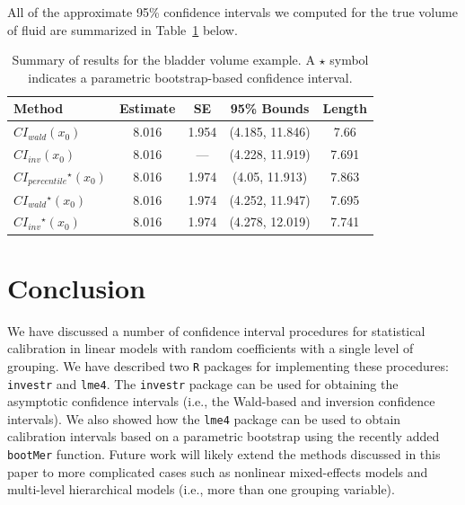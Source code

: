 \documentclass{article}\usepackage[]{graphicx}\usepackage[]{color}
\newcommand{\boot}{\ensuremath{^\star}}
\begin{document}
All of the approximate 95\% confidence intervals we computed for the true volume of fluid are summarized in Table~\ref{tab:summary} below.



\begin{table}[!htb]
\centering
\begin{tabular}{lcccc}
  \toprule
  Method                      &  Estimate & SE & 95\% Bounds & Length \\
  \midrule
  $CI_{wald}\left(x_0\right)$                 & 8.016 & 1.954 & (4.185, 11.846) & 7.66 \\
  $CI_{inv}\left(x_0\right)$            & 8.016 &  ---            & (4.228, 11.919) & 7.691 \\
  $CI_{percentile}\boot\left(x_0\right)$     & 8.016 & 1.974 & (4.05, 11.913) & 7.863 \\
  $CI_{wald}\boot\left(x_0\right)$           & 8.016 & 1.974 & (4.252, 11.947) & 7.695 \\
  $CI_{inv}\boot\left(x_0\right)$      & 8.016 & 1.974 & (4.278, 12.019) & 7.741 \\
  \bottomrule
\end{tabular}
\caption{Summary of results for the bladder volume example.  A $\star$ symbol indicates a parametric bootstrap-based confidence interval. \label{tab:summary}}
\end{table}


\section{Conclusion}

We have discussed a number of confidence interval procedures for statistical calibration in linear models with random coefficients with a single level of grouping.  We have described two \texttt{R} packages for implementing these procedures: \texttt{investr} and \texttt{lme4}.  The \texttt{investr} package can be used for obtaining the asymptotic confidence intervals (i.e., the Wald-based and inversion confidence intervals).  We also showed how the \texttt{lme4} package can be used to obtain calibration intervals based on a parametric bootstrap using the recently added \texttt{bootMer} function.  Future work will likely extend the methods discussed in this paper to more complicated cases such as nonlinear mixed-effects models and multi-level hierarchical models (i.e., more than one grouping variable).



\end{document}

